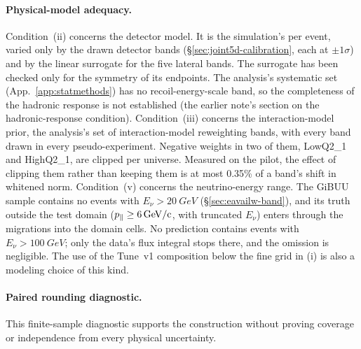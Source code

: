 \paragraph{Physical-model adequacy.} Condition~(ii) concerns the detector model. It is the simulation's per event, varied only by the drawn detector bands (\S\ref{sec:joint5d-calibration}, each at $\pm1\sigma$) and by the linear surrogate for the five lateral bands. The surrogate has been checked only for the symmetry of its endpoints. The analysis's systematic set (App.~\ref{app:statmethods}) has no recoil-energy-scale band, so the completeness of the hadronic response is not established (the earlier note's section on the hadronic-response condition). Condition~(iii) concerns the interaction-model prior, the analysis's set of \jtModelBands{} interaction-model reweighting bands, with every band drawn in every pseudo-experiment. Negative weights in two of them, LowQ2\_1 and HighQ2\_1, are clipped per universe. Measured on the pilot, the effect of clipping them rather than keeping them is at most 0.35\% of a band's shift in whitened norm. Condition~(v) concerns the neutrino-energy range. The GiBUU sample contains no events with $E_{\nu}>\SI{20}{GeV}$ (\S\ref{sec:eavailw-band}), and its truth outside the test domain ($p_{\parallel}\ge\SI{6}{GeV/c}$, with truncated $E_{\nu}$) enters through the migrations into the domain cells. No prediction contains events with $E_{\nu}>\SI{100}{GeV}$; only the data's flux integral stops there, and the omission is negligible. The use of the Tune~v1 composition below the fine grid in (i) is also a modeling choice of this kind.

\paragraph{Paired rounding diagnostic.} This finite-sample diagnostic supports the construction without proving coverage or independence from every physical uncertainty.

